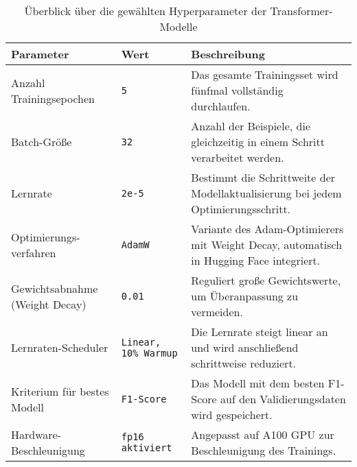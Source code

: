 \begin{table}[htbp]
    \centering
    \renewcommand{\arraystretch}{1.3}
    \begin{tabular}{|p{3cm}|l|p{6cm}|}
        \hline
        \rowcolor{lightgray} \textbf{Parameter} & \textbf{Wert} & \textbf{Beschreibung} \\
        \hline
        Anzahl Trainingsepochen & \texttt{5} & Das gesamte Trainingsset wird fünfmal vollständig durchlaufen. \\
        \hline
        Batch-Größe & \texttt{32} & Anzahl der Beispiele, die gleichzeitig in einem Schritt verarbeitet werden. \\
        \hline
        Lernrate & \texttt{2e-5} & Bestimmt die Schrittweite der Modellaktualisierung bei jedem Optimierungsschritt. \\
        \hline
        Optimierungs-verfahren & \texttt{AdamW} & Variante des Adam-Optimierers mit Weight Decay, automatisch in Hugging Face integriert. \\
        \hline
        Gewichtsabnahme (Weight Decay) & \texttt{0.01} & Reguliert große Gewichtswerte, um Überanpassung zu vermeiden. \\
        \hline
        Lernraten-Scheduler & \texttt{Linear, 10\% Warmup} & Die Lernrate steigt linear an und wird anschließend schrittweise reduziert. \\
        \hline
        Kriterium für bestes Modell & \texttt{F1-Score} & Das Modell mit dem besten F1-Score auf den Validierungsdaten wird gespeichert. \\
        \hline
        Hardware-Beschleunigung & \texttt{fp16 aktiviert} & Angepasst auf A100 GPU zur Beschleunigung des Trainings. \\
        \hline
    \end{tabular}
    \caption{Überblick über die gewählten Hyperparameter der Transformer-Modelle}
    \label{tab:transformer-hyperparameter}
\end{table}


